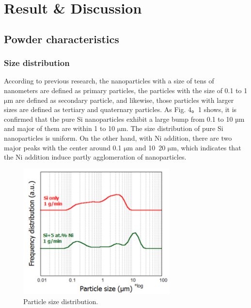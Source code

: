 \chapter{Result \& Discussion}
\section{Powder characteristics}
\subsection{Size distribution}
According to previous research, the nanoparticles with a size of tens of nanometers are defined as primary particles,  the particles with the size of 0.1 to 1 $\mathrm{\mu m}$ are defined as secondary particle, and likewise, those particles with larger sizes are defined as tertiary and quaternary particles.
As Fig. 4。1 shows, it is confirmed that the pure Si nanoparticles exhibit a large bump from 0.1 to 10 µm and major of them are within 1 to 10 $\mathrm{\mu m}$. The size distribution of pure Si nanoparticles  is uniform. On the other hand, with Ni addition, there are two major peaks with the center around 0.1 $\mathrm{\mu m}$ and 10~20 $\mathrm{\mu m}$, which indicates that the Ni addition induce partly agglomeration of nanoparticles. 
\begin{figure}[H]
\centering
\includegraphics[width=8cm]{src/fig/fig42.png}
\caption{Particle size distribution.}
\end{figure}
\newpage
